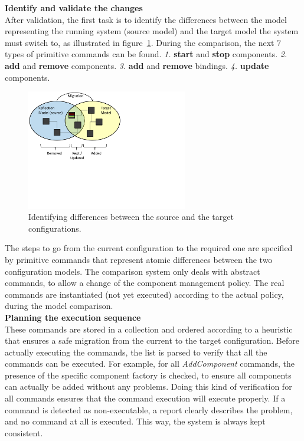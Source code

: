 {\bf Identify and validate the changes} \\
After validation, the first task is to identify the differences between the model representing the running system (source model) and the target model the system must switch to, as illustrated in figure~\ref{figure:comparison}. During the comparison, the next 7 types of primitive commands can be found. \textit{1.} {\bf start} and {\bf stop} components. \textit{2.} {\bf add} and {\bf remove} components. \textit{3.} {\bf add} and {\bf remove} bindings. \textit{4.} {\bf update} components.
\begin{figure}
\begin{center}
\includegraphics[width=7cm]{part2/pics/comparison}
\caption{\label{figure:comparison} Identifying differences between the source and the target configurations.}
\end{center}
\end{figure}
The steps to go from the current configuration to the required one are specified by primitive commands that represent atomic differences between the two configuration models.
The comparison system only deals with abstract commands, to allow a change of the component management policy. The real commands are instantiated (not yet executed) according to the actual policy, during the model comparison.\\

{\bf Planning the execution sequence}\\
These commands are stored in a collection and ordered according to a heuristic~\cite{Andre:2010,Bratskas:2010} that ensures a safe migration from the current to the target configuration. Before actually executing the commands, the list is parsed to verify that all the commands can be executed. For example, for all {\it AddComponent} commands, the presence of the specific component factory is checked, to ensure all components can actually be added without any problems. Doing this kind of verification for all commands ensures that the command execution will execute properly. If a command is detected as non-executable, a report clearly describes the problem, and no command at all is executed. This way, the system is always kept consistent.\\


